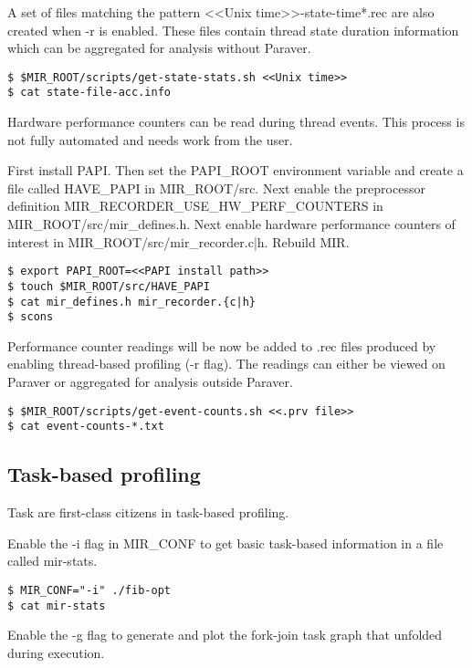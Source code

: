 \documentclass[11pt,a4paper,notitlepage]{article}
\begin{document}
A set of files matching the pattern <<Unix time>>-state-time*.rec are also created when -r is enabled. 
These files contain thread state duration information which can be aggregated for analysis without Paraver.

\begin{lstlisting}[style=BashInputStyle]
$ $MIR_ROOT/scripts/get-state-stats.sh <<Unix time>>
$ cat state-file-acc.info
\end{lstlisting}

Hardware performance counters can be read during thread events. This process is not fully automated and needs work from the user.

First install PAPI. 
Then set the PAPI\_ROOT environment variable and create a file called HAVE\_PAPI in MIR\_ROOT/src.
Next enable the preprocessor definition MIR\_RECORDER\_USE\_HW\_PERF\_COUNTERS in MIR\_ROOT/src/mir\_defines.h.
Next enable hardware performance counters of interest in MIR\_ROOT/src/mir\_recorder.{c|h}.
Rebuild MIR.

\begin{lstlisting}[style=BashInputStyle]
$ export PAPI_ROOT=<<PAPI install path>>
$ touch $MIR_ROOT/src/HAVE_PAPI
$ cat mir_defines.h mir_recorder.{c|h}
$ scons
\end{lstlisting}

Performance counter readings will be now be added to .rec files produced by enabling thread-based profiling (-r flag). 
The readings can either be viewed on Paraver or aggregated for analysis outside Paraver. 

\begin{lstlisting}[style=BashInputStyle]
$ $MIR_ROOT/scripts/get-event-counts.sh <<.prv file>>
$ cat event-counts-*.txt
\end{lstlisting}

\subsection{Task-based profiling}
Task are first-class citizens in task-based profiling.

Enable the -i flag in MIR\_CONF to get basic task-based information in a file called mir-stats.

\begin{lstlisting}[style=BashInputStyle]
$ MIR_CONF="-i" ./fib-opt
$ cat mir-stats
\end{lstlisting}

Enable the -g flag to generate and plot the fork-join task graph that unfolded during execution.
\end{document}
